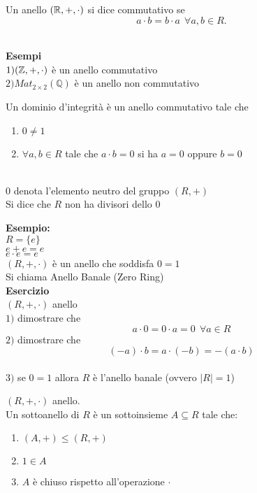 \documentclass[12px]{article}
\begin{document}
{\begin{defi}
	\end{defi}
	\begin{defi}
		Un anello $(\mathbb{R},+,\cdot)$ si dice commutativo se 
		\[
		a\cdot b = b\cdot a \ \ \forall a,b\in R
		.\] 
	\end{defi}
	\newpage \ \\
	\textbf{Esempi}\\
	$1)(\mathbb{Z}, + , \cdot ) $ è un anello commutativo\\
	$2) Mat_{2\times 2}(\mathbb Q)$ è un anello non commutativo\\
	\begin{defi}
		Un dominio d'integrità è un anello commutativo tale che
		\begin{enumerate}
			\item $0\neq 1$
			\item  $\forall a,b\in R$ tale che $a\cdot b = 0$ si ha  $a = 0$ oppure $b = 0$
		\end{enumerate}\\
		$0$ denota l'elemento neutro del gruppo $(R,+)$\\
		Si dice che $R$ non ha divisori dello $0$
	\end{defi}
	\textbf{Esempio:}\\
	$R = \{e\}$\\
	 $e + e = e$\\
	  $e\cdot e = e$\\
	   $(R,+,\cdot)$ è un anello che soddisfa $0 =1$\\
	   Si chiama Anello Banale (Zero Ring) \\
	   \textbf{Esercizio}\\
	   $(R,+,\cdot)$ anello\\
	   $1)$ dimostrare che  \[a \cdot 0 =0\cdot a  = 0 \ \ \forall a\in R\]
   $2)$ dimostrare che  \[(-a)\cdot b = a\cdot (-b) = - (a \cdot b)\]\\
   $3)$ se $0 = 1$ allora  $R$ è l'anello banale (ovvero $|R| = 1$)\\
    \begin{defi}
   	$(R, + ,\cdot)$ anello.\\
	Un sottoanello di $R$ è un sottoinsieme $A\subseteq R$ tale che:\\
	\begin{enumerate}
		\item $(A,+) \leq (R,+)$
		\item $1\in A$
		\item $A$ è chiuso rispetto all'operazione  $\cdot$
	\end{enumerate}

\end{defi}}
\end{document}
